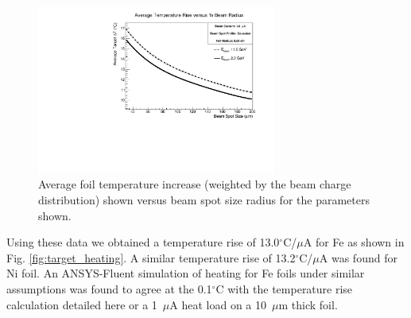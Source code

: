 \documentclass[preprint,12pt]{elsarticle}
\begin{document}
\begin{figure}[ht]
\centering
\includegraphics[width=0.7\textwidth]{FeFoilHeatingdTvsSpotSize.pdf}
\caption{Average foil temperature increase (weighted by the beam charge distribution) shown versus beam spot size radius for the parameters shown.}
\label{fig:spotsize_dep}
\end{figure}
Using these data we obtained a temperature rise of 13.0$^\circ$C/$\mu$A for Fe as shown in Fig. \ref{fig:target_heating}. A similar temperature rise of 13.2$^\circ$C/$\mu$A was found for Ni foil. An ANSYS-Fluent simulation of heating for Fe foils under similar assumptions was found to agree at the 0.1$^\circ$C with the temperature rise calculation detailed here or a 1~$\mu$A  heat load on a 10~$\mu$m thick foil. 
\end{document}
